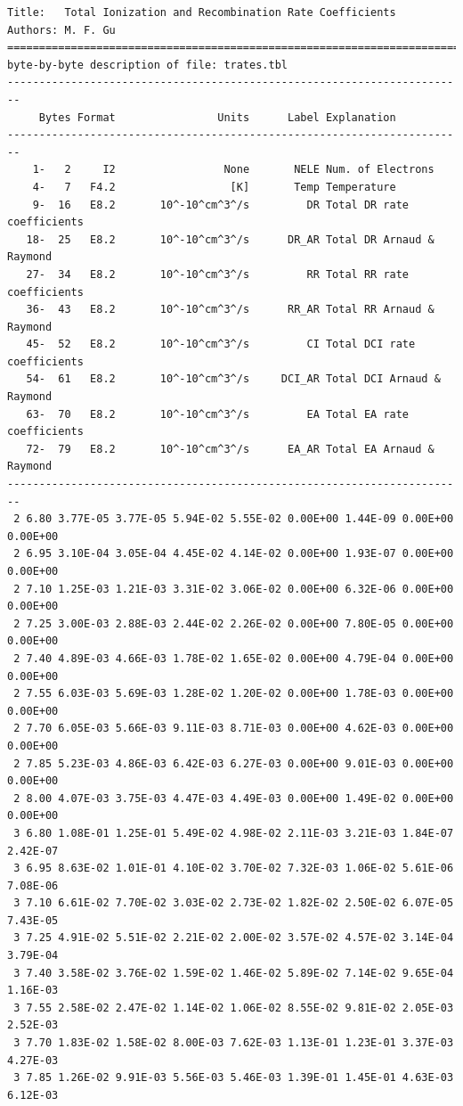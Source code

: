 \documentclass[twoside,letterpaper]{refrep}
\begin{document}
\begin{verbatim}
Title:   Total Ionization and Recombination Rate Coefficients
Authors: M. F. Gu
========================================================================
byte-by-byte description of file: trates.tbl
------------------------------------------------------------------------
     Bytes Format                Units      Label Explanation
------------------------------------------------------------------------
    1-   2     I2                 None       NELE Num. of Electrons
    4-   7   F4.2                  [K]       Temp Temperature
    9-  16   E8.2       10^-10^cm^3^/s         DR Total DR rate coefficients
   18-  25   E8.2       10^-10^cm^3^/s      DR_AR Total DR Arnaud & Raymond
   27-  34   E8.2       10^-10^cm^3^/s         RR Total RR rate coefficients
   36-  43   E8.2       10^-10^cm^3^/s      RR_AR Total RR Arnaud & Raymond
   45-  52   E8.2       10^-10^cm^3^/s         CI Total DCI rate coefficients
   54-  61   E8.2       10^-10^cm^3^/s     DCI_AR Total DCI Arnaud & Raymond
   63-  70   E8.2       10^-10^cm^3^/s         EA Total EA rate coefficients
   72-  79   E8.2       10^-10^cm^3^/s      EA_AR Total EA Arnaud & Raymond
------------------------------------------------------------------------
 2 6.80 3.77E-05 3.77E-05 5.94E-02 5.55E-02 0.00E+00 1.44E-09 0.00E+00 0.00E+00 
 2 6.95 3.10E-04 3.05E-04 4.45E-02 4.14E-02 0.00E+00 1.93E-07 0.00E+00 0.00E+00 
 2 7.10 1.25E-03 1.21E-03 3.31E-02 3.06E-02 0.00E+00 6.32E-06 0.00E+00 0.00E+00 
 2 7.25 3.00E-03 2.88E-03 2.44E-02 2.26E-02 0.00E+00 7.80E-05 0.00E+00 0.00E+00 
 2 7.40 4.89E-03 4.66E-03 1.78E-02 1.65E-02 0.00E+00 4.79E-04 0.00E+00 0.00E+00 
 2 7.55 6.03E-03 5.69E-03 1.28E-02 1.20E-02 0.00E+00 1.78E-03 0.00E+00 0.00E+00 
 2 7.70 6.05E-03 5.66E-03 9.11E-03 8.71E-03 0.00E+00 4.62E-03 0.00E+00 0.00E+00 
 2 7.85 5.23E-03 4.86E-03 6.42E-03 6.27E-03 0.00E+00 9.01E-03 0.00E+00 0.00E+00 
 2 8.00 4.07E-03 3.75E-03 4.47E-03 4.49E-03 0.00E+00 1.49E-02 0.00E+00 0.00E+00 
 3 6.80 1.08E-01 1.25E-01 5.49E-02 4.98E-02 2.11E-03 3.21E-03 1.84E-07 2.42E-07 
 3 6.95 8.63E-02 1.01E-01 4.10E-02 3.70E-02 7.32E-03 1.06E-02 5.61E-06 7.08E-06 
 3 7.10 6.61E-02 7.70E-02 3.03E-02 2.73E-02 1.82E-02 2.50E-02 6.07E-05 7.43E-05 
 3 7.25 4.91E-02 5.51E-02 2.21E-02 2.00E-02 3.57E-02 4.57E-02 3.14E-04 3.79E-04 
 3 7.40 3.58E-02 3.76E-02 1.59E-02 1.46E-02 5.89E-02 7.14E-02 9.65E-04 1.16E-03 
 3 7.55 2.58E-02 2.47E-02 1.14E-02 1.06E-02 8.55E-02 9.81E-02 2.05E-03 2.52E-03 
 3 7.70 1.83E-02 1.58E-02 8.00E-03 7.62E-03 1.13E-01 1.23E-01 3.37E-03 4.27E-03 
 3 7.85 1.26E-02 9.91E-03 5.56E-03 5.46E-03 1.39E-01 1.45E-01 4.63E-03 6.12E-03 

\end{verbatim}
\end{document}
